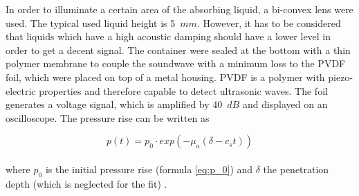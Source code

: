 In order to illuminate a certain area of the absorbing liquid, a bi-convex lens were used. The typical used liquid height is 5~$mm$. However, it has to be considered that liquids which have a high acoustic damping should have a lower level in order to get a decent signal. The container were sealed at the bottom with a thin polymer membrane to couple the soundwave with a minimum loss to the PVDF foil, which were placed on top of a metal housing. PVDF is a polymer with piezo-electric properties and therefore capable to detect ultrasonic waves. The foil generates a voltage signal, which is amplified by 40~$dB$ and displayed on an oscilloscope. The pressure rise can be written as 

\begin{equation}
p(t) = p_0 \cdot exp(-\mu_a(\delta-c_s t))
\end{equation}  
\\
where $p_0$ is the initial pressure rise (formula \ref{eq:p_0}) and $\delta$ the penetration depth (which is neglected for the fit) \cite{demtroder:ExPhysik}. 

